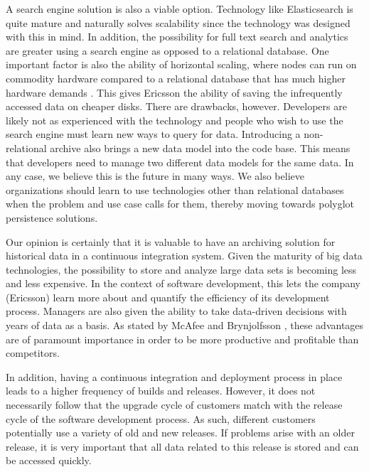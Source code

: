 A search engine solution is also a viable option. Technology like Elasticsearch is quite mature and naturally solves scalability since the technology was designed with this in mind. In addition, the possibility for full text search and analytics are greater using a search engine as opposed to a relational database. One important factor is also the ability of horizontal scaling, where nodes can run on commodity hardware compared to a relational database that has much higher hardware demands \cite{NoSQLERA}. This gives Ericsson the ability of saving the infrequently accessed data on cheaper disks. There are drawbacks, however. Developers are likely not as experienced with the technology and people who wish to use the search engine must learn new ways to query for data. Introducing a non-relational archive also brings a new data model into the code base. This means that developers need to manage two different data models for the same data. In any case, we believe this is the future in many ways. We also believe organizations should learn to use technologies other than relational databases when the problem and use case calls for them, thereby moving towards polyglot persistence solutions.

Our opinion is certainly that it is valuable to have an archiving solution for historical data in a continuous integration system. Given the maturity of big data technologies, the possibility to store and analyze large data sets is becoming less and less expensive. In the context of software development, this lets the company (Ericsson) learn more about and quantify the efficiency of its development process. Managers are also given the ability to take data-driven decisions with years of data as a basis. As stated by McAfee and Brynjolfsson \cite{bigDataMane}, these advantages are of paramount importance in order to be more productive and profitable than competitors.

In addition, having a continuous integration and deployment process in place leads to a higher frequency of builds and releases. However, it does not necessarily follow that the upgrade cycle of customers match with the release cycle of the software development process. As such, different customers potentially use a variety of old and new releases. If problems arise with an older release, it is very important that all data related to this release is stored and can be accessed quickly.

